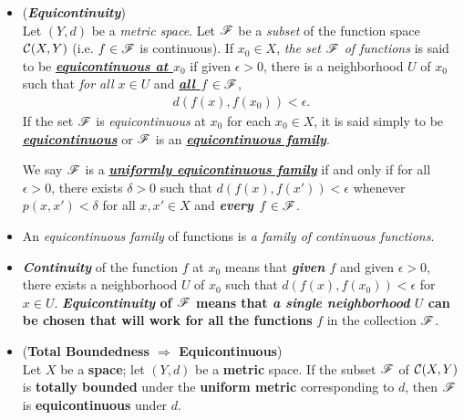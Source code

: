 \documentclass[11pt]{article}
\begin{document}
\begin{itemize}
\item \begin{definition}  (\emph{\textbf{Equicontinuity}}) \citep{reed1980methods, munkres2000topology} \\
Let $(Y, d)$ be a \emph{metric space}. Let ${\mathscr F}$ be a \emph{subset} of the function space ${\mathcal C}(X, Y)$ (i.e. $f \in {\mathscr F}$ is continuous). If $x_0 \in X$, \emph{the set ${\mathscr F}$ of functions} is said to be \underline{\emph{\textbf{equicontinuous at $x_0$}}} if given $\epsilon >0$, there is a neighborhood $U$ of $x_0$ such that \emph{for all $x \in U$} and \underline{\emph{\textbf{all $f \in {\mathscr F}$}}},
\begin{align*}
d(f(x), f(x_0)) < \epsilon.
\end{align*}
If the set ${\mathscr F}$ is \emph{equicontinuous} at $x_0$ for each $x_0 \in X$, it is said simply to be \underline{\emph{\textbf{equicontinuous}}} or ${\mathscr F}$ is an \underline{\emph{\textbf{equicontinuous family}}}.

We say ${\mathscr F}$ is a \underline{\emph{\textbf{uniformly equicontinuous family}}} if and only if for all $\epsilon >0$, there exists $\delta > 0$ such that $d(f(x), f(x')) < \epsilon$ whenever $p(x, x') < \delta$ for all $x, x' \in X$ and \emph{\textbf{every $f \in {\mathscr F}$}}.
\end{definition}

\item \begin{remark}
An \emph{equicontinuous family} of functions is \emph{a family of continuous functions}.
\end{remark}

\item \begin{remark}
\emph{\textbf{Continuity}} of the function $f$ at $x_0$ means that \emph{\textbf{given} $f$} and given $\epsilon >0$, there exists a neighborhood $U$ of $x_0$ such that $d(f(x), f(x_0)) < \epsilon$ for $x \in U$. 
\textbf{
\emph{\textbf{Equicontinuity}} of ${\mathscr F}$ means that \emph{\textbf{a single neighborhood}} $U$ can be chosen that will \emph{}work for all the functions} $f$ in the collection ${\mathscr F}$.
\end{remark}

\item \begin{lemma} (\textbf{Total Boundedness $\Rightarrow$ Equicontinuous}) \citep{munkres2000topology}\\ 
Let $X$ be a \textbf{space}; let $(Y, d)$ be a \textbf{metric} space. If the subset ${\mathscr F}$ of ${\mathcal C}(X, Y)$ is \textbf{totally bounded} under the \textbf{uniform metric} corresponding to $d$, then ${\mathscr F}$ is \textbf{equicontinuous} under $d$.
\end{lemma}


\end{itemize}
\end{document}
